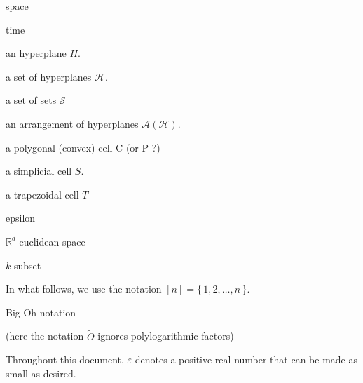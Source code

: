 
space

time

an hyperplane \(H\).

a set of hyperplanes \(\mathcal{H}\).

a set of sets \(\mathcal{S}\)

an arrangement of hyperplanes \(\mathcal{A}(\mathcal{H})\).

a polygonal (convex) cell C (or P ?)

a simplicial cell \(S\).

a trapezoidal cell \(T\)

epsilon

\(\mathbb{R}^d\) euclidean space

\(k\)-subset

In what follows, we use the notation \([n] = \{\,1,2,\ldots ,n\,\}\).

Big-Oh notation

(here the notation $\tilde{O}$ ignores polylogarithmic
factors)

Throughout this document, $\varepsilon$ denotes a positive real
number that can be made as small as desired.
